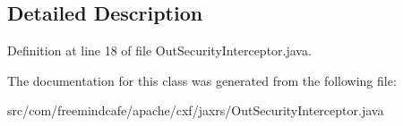 \subsection{Detailed Description}


Definition at line 18 of file Out\+Security\+Interceptor.\+java.



The documentation for this class was generated from the following file\+:\begin{DoxyCompactItemize}
\item 
src/com/freemindcafe/apache/cxf/jaxrs/Out\+Security\+Interceptor.\+java\end{DoxyCompactItemize}
